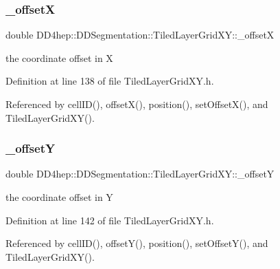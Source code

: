 \subsubsection{\texorpdfstring{\+\_\+offsetX}{\_offsetX}}
{\footnotesize\ttfamily double D\+D4hep\+::\+D\+D\+Segmentation\+::\+Tiled\+Layer\+Grid\+X\+Y\+::\+\_\+offsetX\hspace{0.3cm}{\ttfamily [protected]}}



the coordinate offset in X 



Definition at line 138 of file Tiled\+Layer\+Grid\+X\+Y.\+h.



Referenced by cell\+I\+D(), offset\+X(), position(), set\+Offset\+X(), and Tiled\+Layer\+Grid\+X\+Y().

\hypertarget{class_d_d4hep_1_1_d_d_segmentation_1_1_tiled_layer_grid_x_y_ab8f5e777f372e32435efd7d915217b79}{}\label{class_d_d4hep_1_1_d_d_segmentation_1_1_tiled_layer_grid_x_y_ab8f5e777f372e32435efd7d915217b79} 
\subsubsection{\texorpdfstring{\+\_\+offsetY}{\_offsetY}}
{\footnotesize\ttfamily double D\+D4hep\+::\+D\+D\+Segmentation\+::\+Tiled\+Layer\+Grid\+X\+Y\+::\+\_\+offsetY\hspace{0.3cm}{\ttfamily [protected]}}



the coordinate offset in Y 



Definition at line 142 of file Tiled\+Layer\+Grid\+X\+Y.\+h.



Referenced by cell\+I\+D(), offset\+Y(), position(), set\+Offset\+Y(), and Tiled\+Layer\+Grid\+X\+Y().

\hypertarget{class_d_d4hep_1_1_d_d_segmentation_1_1_tiled_layer_grid_x_y_a55a6c20f981c68d6fbb3bbc8823ff770}{}\label{class_d_d4hep_1_1_d_d_segmentation_1_1_tiled_layer_grid_x_y_a55a6c20f981c68d6fbb3bbc8823ff770} 
